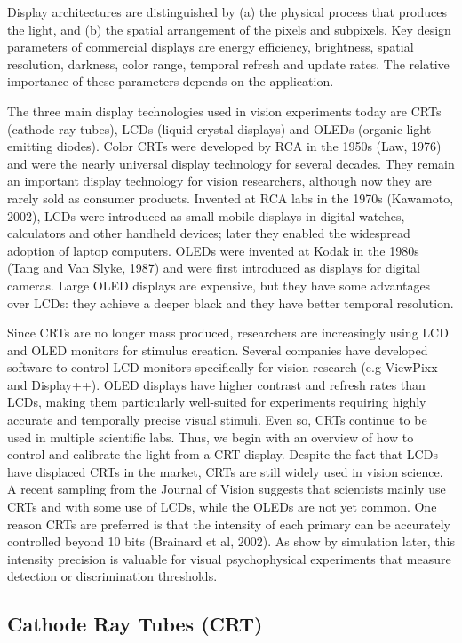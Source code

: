 \documentclass[
  letterpaper,
]{book}
\begin{document}
Display architectures are distinguished by (a) the physical process that
produces the light, and (b) the spatial arrangement of the pixels and
subpixels. Key design parameters of commercial displays are energy
efficiency, brightness, spatial resolution, darkness, color range,
temporal refresh and update rates. The relative importance of these
parameters depends on the application.

The three main display technologies used in vision experiments today are
CRTs (cathode ray tubes), LCDs (liquid-crystal displays) and OLEDs
(organic light emitting diodes). Color CRTs were developed by RCA in the
1950s (Law, 1976) and were the nearly universal display technology for
several decades. They remain an important display technology for vision
researchers, although now they are rarely sold as consumer products.
Invented at RCA labs in the 1970s (Kawamoto, 2002), LCDs were introduced
as small mobile displays in digital watches, calculators and other
handheld devices; later they enabled the widespread adoption of laptop
computers. OLEDs were invented at Kodak in the 1980s (Tang and Van
Slyke, 1987) and were first introduced as displays for digital cameras.
Large OLED displays are expensive, but they have some advantages over
LCDs: they achieve a deeper black and they have better temporal
resolution.

Since CRTs are no longer mass produced, researchers are increasingly
using LCD and OLED monitors for stimulus creation. Several companies
have developed software to control LCD monitors specifically for vision
research (e.g ViewPixx and Display++). OLED displays have higher
contrast and refresh rates than LCDs, making them particularly
well-suited for experiments requiring highly accurate and temporally
precise visual stimuli. Even so, CRTs continue to be used in multiple
scientific labs. Thus, we begin with an overview of how to control and
calibrate the light from a CRT display. Despite the fact that LCDs have
displaced CRTs in the market, CRTs are still widely used in vision
science. A recent sampling from the Journal of Vision suggests that
scientists mainly use CRTs and with some use of LCDs, while the OLEDs
are not yet common. One reason CRTs are preferred is that the intensity
of each primary can be accurately controlled beyond 10 bits (Brainard et
al, 2002). As show by simulation later, this intensity precision is
valuable for visual psychophysical experiments that measure detection or
discrimination thresholds.

\subsection{Cathode Ray Tubes (CRT)}\label{cathode-ray-tubes-crt}
\end{document}
